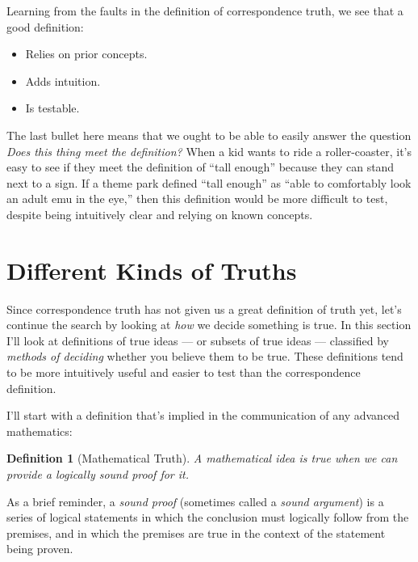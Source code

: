 \documentclass[9pt, twoside]{book}
\newtheorem*{defn}{Definition}
\theoremstyle{argtstyle}
\begin{document}
Learning from the faults in the definition of correspondence truth,
we see that a good definition:
\begin{itemize}
    \item Relies on prior concepts.
    \item Adds intuition.
    \item Is testable.
\end{itemize}

The last bullet here means that
we ought to be able to easily
answer the question {\em Does this thing
meet the definition?}
When a kid wants to ride a roller-coaster,
it's easy to see if they meet the definition
of ``tall enough'' because they can stand
next to a sign. If a theme park defined
``tall enough'' as ``able to comfortably
look an adult emu in the eye,'' then this
definition would be more difficult to test,
despite being intuitively clear and
relying on known concepts.


\section{Different Kinds of Truths}

Since correspondence truth has not given
us a great definition of truth yet, let's
continue the search by looking at {\em how}
we decide something is true.
In this section I'll look at definitions
of true ideas ---
or subsets of true ideas ---
classified by {\em methods of deciding}
whether you
believe them to be true.
These definitions tend to be more intuitively useful and easier to
test than the correspondence definition.

I'll start with a definition that's
implied in the communication of any advanced mathematics:

\begin{defn}[Mathematical Truth]
    A mathematical idea is true when we can provide a logically sound proof for
    it.
\end{defn}

As a brief reminder, a {\em sound proof} (sometimes called a
{\em sound argument}) is a series of logical statements in
which the conclusion must logically follow from the premises, and in which the
premises are true in the context of the statement being proven.
\end{document}
